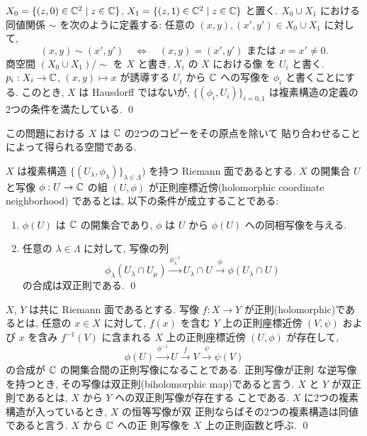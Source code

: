 \documentclass[12pt,twoside]{jarticle}
\def\C{{\Bbb C}} %
\begin{document}
\begin{question}
  $X_0 = \{(z,0)\in\C^2\mid z\in\C\}$, 
  $X_1 = \{(z,1)\in\C^2\mid z\in\C\}$ と置く. %
  $X_0\cup X_1$ における同値関係 $\sim$ を次のように定義する: %
  任意の $(x,y),(x',y')\in X_0\cup X_1$ に対して,
  \[
    (x,y)\sim(x',y')
    \quad\Leftrightarrow\quad
    \text{$(x,y)=(x',y')$ または $x=x'\ne0$.}
  \] %
  商空間 $(X_0\cup X_1)/{\sim}$ を $X$ と書き, $X_i$ の $X$ における像
  を $U_i$ と書く. $p_i : X_i \to \C$, $(x,y)\mapsto x$ が誘導する 
  $U_i$ から $\C$ への写像を $\phi_i$ と書くことにする. このとき,
  $X$ は Hausdorff ではないが, 
  $\{(\phi_i,U_i)\}_{i=0,1}$ は複素構造の定義の2つの条件を満たしている.
  \qed
\end{question}

\noindent この問題における $X$ は $\C$ の2つのコピーをその原点を除いて
貼り合わせることによって得られる空間である. 

\begin{Definition}[正則座標近傍の定義]
  $X$ は複素構造 $\{(U_\lambda,\phi_\lambda)\}_{\lambda\in\Lambda})$ %
  を持つ Riemann 面であるとする. $X$ の開集合 $U$ と写像 $\phi:U\to\C$
  の組 $(U,\phi)$ が正則座標近傍(holomorphic coordinate neighborhood)
  であるとは, 以下の条件が成立することである:
  \begin{enumerate}
  \item $\phi(U)$ は $\C$ の開集合であり, $\phi$ は $U$ から $\phi(U)$
    への同相写像を与える.
  \item 任意の $\lambda\in\Lambda$ に対して, 写像の列
    \[
      \phi_\lambda(U_\lambda\cap U_\mu)
      \overset{\phi_\lambda^{-1}}\longrightarrow
      U_\lambda\cap U
      \overset{\phi}\longrightarrow
      \phi(U_\lambda\cap U)
    \]%
    の合成は双正則である.
    \qed
  \end{enumerate}
\end{Definition}

\begin{Definition}
  $X$, $Y$ は共に Riemann 面であるとする. %
  写像 $f \colon X \to Y$ が正則(holomorphic)であるとは, %
  任意の $x\in X$ に対して, %
  $f(x)$ を含む $Y$ 上の正則座標近傍 $(V, \psi)$ および %
  $x$ を含み $f^{-1}(V)$ に含まれる $X$ 上の正則座標近傍 $(U, \phi)$ 
  が存在して,
  \[
    \phi(U)
    \overset{\phi^{-1}}\longrightarrow
    U
    \overset{f}\longrightarrow
    V
    \overset{\psi}\longrightarrow
    \psi(V)
  \]
  の合成が $\C$ の開集合間の正則写像になることである.  正則写像が正則
  な逆写像を持つとき, その写像は双正則(biholomorphic map)であると言う.
  $X$ と $Y$ が双正則であるとは, $X$ から $Y$ への双正則写像が存在する
  ことである. $X$ に2つの複素構造が入っているとき, $X$ の恒等写像が双
  正則ならばその2つの複素構造は同値であると言う.  $X$ から $\C$ への正
  則写像を $X$ 上の正則函数と呼ぶ. 
  \qed 
\end{Definition}
\end{document}
